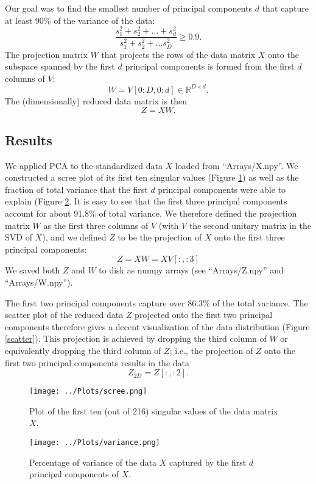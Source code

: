 \documentclass[12pt]{article}
\begin{document}
Our goal was to find the smallest number of principal components $d$ that capture at least 90\% of the variance of the data:
\[ \frac{s_1^2+s_2^2+\ldots +s_d^2}{s_1^2+s_2^2+\ldots s_D^2} \geq 0.9. \]
The projection matrix $W$ that projects the rows of the data matrix $X$ onto the subspace spanned by the first $d$ principal components is formed from the first $d$ columns of $V$:
\[ W = V[0:D, 0:d] \in \mathbb{R}^{D\times d}. \]
The (dimensionally) reduced data matrix is then
\[ Z = X W. \]

\subsection{Results}

We applied PCA to the standardized data $X$ loaded from ``Arrays/X.npy''. We constructed a scree plot of its first ten singular values (Figure \ref{scree}) as well as the fraction of total variance that the first $d$ principal components were able to explain (Figure \ref{variance}. It is easy to see that the first three principal components account for about 91.8\% of total variance. We therefore defined the projection matrix $W$ as the first three columns of $V$ (with $V$ the second unitary matrix in the SVD of $X$), and we defined $Z$ to be the projection of $X$ onto the first three principal components:
\[ Z = X W = X V[:, :3] \]
We saved both $Z$ and $W$ to disk as numpy arrays (see ``Arrays/Z.npy'' and ``Arrays/W.npy'').

The first two principal components capture over 86.3\% of the total variance. The scatter plot of the reduced data $Z$ projected onto the first two principal components therefore gives a decent visualization of the data distribution (Figure \ref{scatter}). This projection is achieved by dropping the third column of $W$ or equivalently dropping the third column of $Z$; i.e., the projection of $Z$ onto the first two principal components results in the data
\[ Z_{2D} = Z[:, :2]. \]

\begin{figure}
\centering
\texttt{[image: ../Plots/scree.png]}
\caption{\label{scree} Plot of the first ten (out of 216) singular values of the data matrix $X$.}
\end{figure}

\begin{figure}
\centering
\texttt{[image: ../Plots/variance.png]}
\caption{\label{variance} Percentage of variance of the data $X$ captured by the first $d$ principal components of $X$.}
\end{figure}
\end{document}
